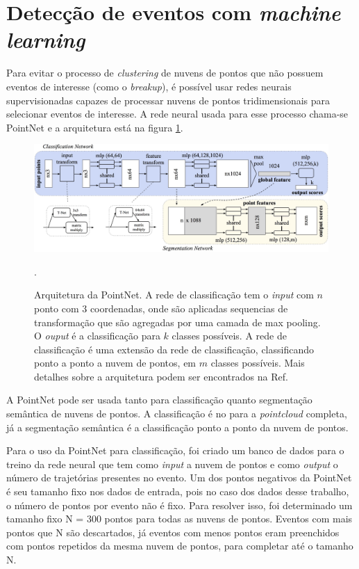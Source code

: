 \documentclass[a4paper,12pt,oneside]{book}
\begin{document}
\section{Detecção de eventos com \textit{machine learning}}\label{sec:pointnet}

\par Para evitar o processo de \textit{clustering} de nuvens de pontos que não possuem eventos de interesse (como o \textit{breakup}), é possível usar redes neurais supervisionadas capazes de processar nuvens de pontos tridimensionais para selecionar eventos de interesse. A rede neural usada para esse processo chama-se PointNet \cite{qi2016pointnet} e a arquitetura está na figura \ref{fig:aqr:pointnet}.

\begin{figure}[H]
    \centering
    \includegraphics[scale = 0.22]{figs/pointnet_arch.png}
    \caption{Arquitetura da PointNet. A rede de classificação tem o \textit{input} com $n$ ponto com 3 coordenadas, onde são aplicadas sequencias de transformação que são agregadas por uma camada de max pooling. O \textit{ouput} é a classificação para $k$ classes possíveis. A rede de classificação é uma extensão da rede de classificação, classificando ponto a ponto a nuvem de pontos, em $m$ classes possíveis. Mais detalhes sobre a arquitetura podem ser encontrados na Ref. \cite{qi2016pointnet}}.
    \label{fig:aqr:pointnet}
\end{figure}


\par A PointNet pode ser usada tanto para classificação quanto segmentação semântica de nuvens de pontos\cite{qi2016pointnet}. A classificação é no para a \textit{pointcloud} completa, já a segmentação semântica é a classificação ponto a ponto da nuvem de pontos\cite{qi2016pointnet}.

\par  Para o uso da PointNet para classificação, foi criado um banco de dados para o treino da rede neural que tem como \textit{input} a nuvem de pontos e como \textit{output} o número de trajetórias presentes no evento. Um dos pontos negativos da PointNet é seu tamanho fixo nos dados de entrada\cite{qi2016pointnet}, pois no caso dos dados desse trabalho, o número de pontos por evento não é  fixo. Para resolver isso, foi determinado um tamanho fixo N = 300 pontos para todas as nuvens de pontos. Eventos com mais pontos que N são descartados, já eventos com menos pontos eram preenchidos com pontos repetidos da mesma nuvem de pontos, para completar até o tamanho N.
\end{document}
